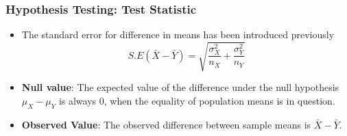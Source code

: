 \begin{frame}
\frametitle{Hypothesis Testing: Test Statistic}

\begin{itemize}
\item The standard error for difference in means has been introduced previously
\[ S.E(\bar{X} - \bar{Y}) = \sqrt{\frac{\sigma^2_X}{n_X} + \frac{\sigma^2_Y}{n_Y}} \]
\item \textbf{Null value}: The expected value of the difference under the null hypothesis $\mu_X - \mu_Y$ is always 0, when the equality of population means is in question.
\item \textbf{Observed Value}: The observed difference between sample means is $\bar{X} - \bar{Y}$.
\end{itemize}



\end{frame}

